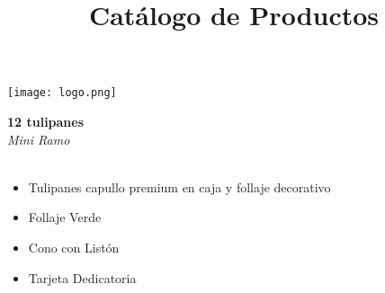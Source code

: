 \documentclass{article}
\begin{document}
\begin{center}
    \texttt{[image: logo.png]}
\end{center}
\title{Catálogo de Productos}
\maketitle

\noindent
\begin{minipage}{0.6\textwidth}
    \textcolor{cpred}{\textbf{\huge 12 tulipanes }}\\
    {\textit{Mini Ramo}} \\
    \textcolor{cpred}{\Huge \textheartsuit} \\
    \vspace{0.5cm}
    \begin{itemize}
        \item Tulipanes capullo premium en caja y follaje decorativo
        \item Follaje Verde
        \item Cono con Listón
        \item Tarjeta Dedicatoria
    \end{itemize}
\end{minipage}
\hspace{1cm}
\end{document}

